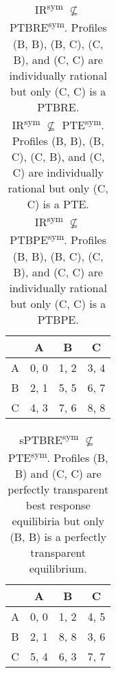 \begin{table}
	\caption{
		\\IR\textsuperscript{sym} $\not\subseteq$ PTBRE\textsuperscript{sym}.
		Profiles (B, B), (B, C), (C, B), and (C, C) are individually rational but only (C, C) is a PTBRE.\vspace{5pt}\\
		IR\textsuperscript{sym} $\not\subseteq$ PTE\textsuperscript{sym}.
		Profiles (B, B), (B, C), (C, B), and (C, C) are individually rational but only (C, C) is a PTE.\vspace{5pt}\\
		IR\textsuperscript{sym} $\not\subseteq$ PTBPE\textsuperscript{sym}.
		Profiles (B, B), (B, C), (C, B), and (C, C) are individually rational but only (C, C) is a PTBPE.
	}
	\label{tab:ir-ne-ptbre}
	\label{tab:ir-not-sub-pte}
	\label{tab:ir-not-sub-ptbpe}
	\centering
	\begin{tabular}{|c|c|c|c|}
		\hline
			& A		& B	   & C	  \\
		\hline
		A 		&\cellcolor{gray!70} 0, 0 &\cellcolor{gray!70} 1, 2 &\cellcolor{gray!70} 3, 4 \\
		\hline
		B		&\cellcolor{gray!70} 2, 1 &\cellcolor{gray!20} 5, 5 &\cellcolor{gray!20} 6, 7 \\
		\hline
		C		&\cellcolor{gray!70} 4, 3 &\cellcolor{gray!20} 7, 6 &\cellcolor{gray!00} 8, 8 \\
		\hline
	\end{tabular}
\end{table}

\begin{table}
	\caption{
		sPTBRE\textsuperscript{sym} $\not\subseteq$ PTE\textsuperscript{sym}.
		Profiles (B, B) and (C, C) are perfectly transparent best response equilibiria but only (B, B) is a perfectly transparent equilibrium.
	}
	\label{tab:ptbre-ne-pte}
	\centering
	\begin{tabular}{|c|c|c|c|}
		\hline
			& A		& B	   & C	  \\
		\hline
		A 		&\cellcolor{gray!70} 0, 0 &\cellcolor{gray!70} 1, 2 &\cellcolor{gray!70} 4, 5 \\
		\hline
		B		&\cellcolor{gray!70} 2, 1 &\cellcolor{gray!00} 8, 8 &\cellcolor{gray!70} 3, 6 \\
		\hline
		C		&\cellcolor{gray!70} 5, 4 &\cellcolor{gray!70} 6, 3 &\cellcolor{gray!20} 7, 7 \\
		\hline
	\end{tabular}
\end{table}

